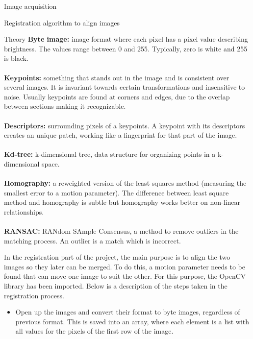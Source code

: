 \documentclass[11pt]{article}
\begin{document}
\begin{section}{Image acquisition}
    \begin{subsection}{Registration algorithm to align images}
        \label{sec:image_registration}
        \begin{subsubsection}{Theory}
            \textbf{Byte image:} image format where each pixel has a pixel value describing brightness. The values range between 0 and 255. Typically, zero is white and 255 is black.
            \\ \\
            \textbf{Keypoints:} something that stands out in the image and is consistent over several images. It is invariant towards certain transformations and insensitive to noise. Usually keypoints are found at corners and edges, due to the overlap between sections making it recognizable.
            \\ \\
            \textbf{Descriptors:} surrounding pixels of a keypoints. A keypoint with its descriptors creates an unique patch, working like a fingerprint for that part of the image.
            \\ \\
            \textbf{Kd-tree:} k-dimensional tree, data structure for organizing points in a k-dimensional space.
            \\ \\
            \textbf{Homography:} a reweighted version of the least squares method (measuring the smallest error to a motion parameter). The difference between least square method and homography is subtle but homography works better on non-linear relationships.
            \\ \\
            \textbf{RANSAC:} RANdom SAmple Consensus, a method to remove outliers in the matching process. An outlier is a match which is incorrect.
        \end{subsubsection}

        In the registration part of the project, the main purpose is to align the two images so they later can be merged. To do this, a motion parameter needs to be found that can move one image to suit the other. For this purpose, the OpenCV library has been imported. Below is a description of the steps taken in the registration process.

        \begin{itemize}
            \item Open up the images and convert their format to byte images, regardless of previous format. This is saved into an array, where each element is a list with all values for the pixels of the first row of the image.


\end{itemize}
\end{subsection}
\end{section}
\end{document}
